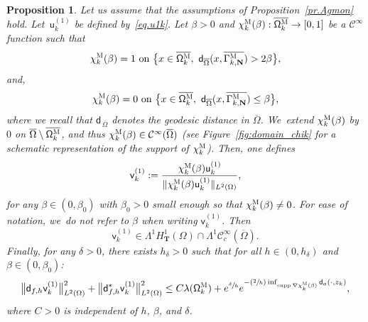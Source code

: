 \documentclass[10pt]{amsart}
\newcommand{\Psfrac}[2]{(\sfrac{#1}{#2})}
\newcommand{\mbf}[1]{\mathbf{#1}}
\DeclareMathOperator\supp{supp}
\theoremstyle{plain}
\newtheorem{proposition}{Proposition}
\theoremstyle{definition}
\begin{document}
\begin{proposition}\label{pr.AgmonQM}
Let us assume that the assumptions of Proposition~\ref{pr.Agmon} hold.
Let~$\mathsf u^{(1)}_k$ be defined by~\eqref{eq.u1k}.
Let $\beta>0$ and $\chi_k^{\textsc{M}} (\beta): \overline{ \mathsf \Omega_k^{\textsc{M}}} \to [0,1]$ be a $\mathcal C^\infty$ function such that
\begin{equation}\label{eq.supp-close1}
\chi_k^{\textsc{M}} (\beta)=1 \text{ on } \big \{x\in \overline{ \mathsf \Omega_k^{\textsc{M}}}, \ \mathsf d_{\overline \Omega}(x, \overline{\Gamma_{k,\mbf N}^{\textsc{M}}})>2\beta\big \},
\end{equation}
and,
\begin{equation}\label{eq.supp-close2}
\chi_k^{\textsc{M}} (\beta)=0 \text{ on }\big \{x\in \overline{ \mathsf \Omega_k^{\textsc{M}}}, \ \mathsf d_{\overline \Omega}(x, \overline{\Gamma_{k,\mbf N}^{\textsc{M}}})\le \beta\big \},
\end{equation}
where we recall that $\mathsf d_{\, \overline \Omega}$ denotes the geodesic distance in $\overline \Omega$. We~extend $ \chi_k^{\textsc{M}} (\beta)$ by $0$ on $\overline{\Omega}\setminus \overline{ \mathsf \Omega_k^{\textsc{M}}}$, and thus $\chi_k^{\textsc{M}} (\beta)\in \mathcal C^\infty(\overline \Omega)$ (see Figure~\ref{fig:domain_chik} for a schematic representation of the support of $ \chi_k^{\textsc{M}}$).
Then, one defines
\begin{equation}\label{eq.QM1}
\mathsf v_k^{(1)}:=\frac{ \chi_k^{\textsc{M}} (\beta) \mathsf u_k^{(1)} }{\Vert \chi_k^{\textsc{M}} (\beta)\mathsf u_k^{(1)}\Vert _{ L^2 (\Omega) }},
\end{equation}
for any $\beta \in (0,\beta_0)$ with $\beta_0>0$ small enough so that
$\chi_k^{\textsc{M}} (\beta) \neq 0$.
For ease of notation, we~do not refer to $\beta$ when writing $\mathsf v_k^{(1)}$.
Then
\[
\mathsf v_k^{(1)}\in \Lambda^1H^1_{\mbf T}(\Omega) \cap \Lambda^1\mathcal C^\infty_c (\overline \Omega).
\]
Finally, for any $\delta>0$, there exists $h_\delta>0$ such that for
all $h\in (0,h_\delta)$ and $\beta \in (0,\beta_0)$:
\[
\big \| \mathsf d_{f,h} \mathsf v_k^{(1)} \big \|^{2}_{ L^{2} (\Omega)}+
\big \| \mathsf d^{*}_{f,h} \mathsf v_k^{(1)} \big \|^{2}_{ L^{2} (\Omega)}\le C\lambda(\mathsf \Omega_k^{\textsc{M}})+ e^{\sfrac \delta h} e^{-\Psfrac 2h \inf_{\supp \nabla \chi_k^{\textsc{M}} (\beta)} \mathsf d_a(\cdot,z_k)},
\]
where $C>0$ is independent of $h$, $\beta$, and $\delta$.
\end{proposition}
\end{document}

